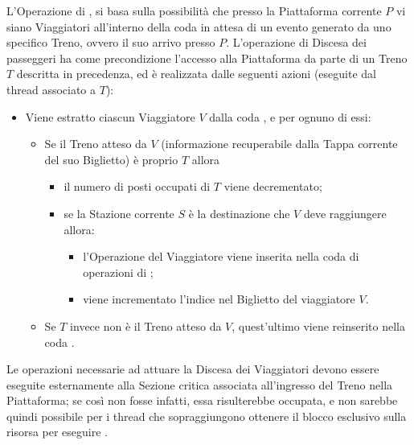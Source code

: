 \begin{description}
		L'Operazione di , si basa sulla possibilità che presso la Piattaforma corrente $P$ vi siano Viaggiatori all'interno della coda  in attesa di un evento generato da uno specifico Treno, ovvero il suo arrivo presso $P$. L'operazione di Discesa dei passeggeri ha come precondizione l'accesso alla Piattaforma da parte di un Treno $T$ descritta in precedenza, ed è realizzata dalle seguenti azioni (eseguite dal thread associato a $T$):
		\begin{itemize}
			\item Viene estratto ciascun Viaggiatore $V$ dalla coda , e per ognuno di essi:
			\begin{itemize}
				\item Se il Treno atteso da $V$ (informazione recuperabile dalla Tappa corrente del suo Biglietto) è proprio $T$ allora
					\begin{itemize}
						\item il numero di posti occupati di $T$ viene decrementato;
						\item se la Stazione corrente $S$  è la destinazione che $V$ deve raggiungere allora:
							\begin{itemize}
								\item l'Operazione  del Viaggiatore viene inserita nella coda di operazioni di ;
								\item viene incrementato l'indice  nel Biglietto del viaggiatore $V$.
							\end{itemize}
					\end{itemize}
				\item Se $T$ invece non è il Treno atteso da $V$, quest'ultimo viene reinserito nella coda .
			\end {itemize}
		\end{itemize}
		
	Le operazioni necessarie ad attuare la Discesa dei Viaggiatori devono essere eseguite esternamente alla Sezione critica associata all'ingresso del Treno nella Piattaforma; se così non fosse infatti, essa risulterebbe occupata, e non sarebbe quindi possibile per i thread che sopraggiungono ottenere il blocco esclusivo sulla risorsa per eseguire .
	
	\item{}


\end{description}
